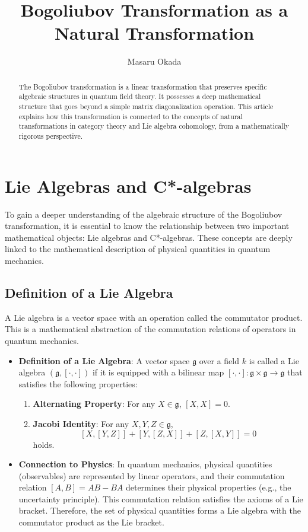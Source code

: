 \documentclass[uplatex,a4j,12pt,dvipdfmx]{article}
\title{
Bogoliubov Transformation \newline as a Natural Transformation
}
\author{
Masaru Okada
}
\begin{document}
\maketitle

\begin{abstract}
    The Bogoliubov transformation is a linear transformation that preserves specific algebraic structures in quantum field theory. It possesses a deep mathematical structure that goes beyond a simple matrix diagonalization operation. This article explains how this transformation is connected to the concepts of natural transformations in category theory and Lie algebra cohomology, from a mathematically rigorous perspective.
\end{abstract}


\section{Lie Algebras and C*-algebras}

To gain a deeper understanding of the algebraic structure of the Bogoliubov transformation, it is essential to know the relationship between two important mathematical objects: Lie algebras and C*-algebras. These concepts are deeply linked to the mathematical description of physical quantities in quantum mechanics.

\subsection{Definition of a Lie Algebra}

A Lie algebra is a vector space with an operation called the commutator product. This is a mathematical abstraction of the commutation relations of operators in quantum mechanics.

\begin{itemize}
    \item \textbf{Definition of a Lie Algebra}:
    A vector space $\mathfrak{g}$ over a field $k$ is called a Lie algebra $(\mathfrak{g}, [\cdot, \cdot])$ if it is equipped with a bilinear map $[\cdot, \cdot]: \mathfrak{g} \times \mathfrak{g} \to \mathfrak{g}$ that satisfies the following properties:
    \begin{enumerate}
        \item \textbf{Alternating Property}: For any $X \in \mathfrak{g}$, $[X, X] = 0$.
        \item \textbf{Jacobi Identity}: For any $X, Y, Z \in \mathfrak{g}$,
        \[
            [X, [Y, Z]] + [Y, [Z, X]] + [Z, [X, Y]] = 0
        \]
        holds.
    \end{enumerate}
    \item \textbf{Connection to Physics}:
    In quantum mechanics, physical quantities (observables) are represented by linear operators, and their commutation relation $[A, B] = AB - BA$ determines their physical properties (e.g., the uncertainty principle). This commutation relation satisfies the axioms of a Lie bracket. Therefore, the set of physical quantities forms a Lie algebra with the commutator product as the Lie bracket.
\end{itemize}
\end{document}
